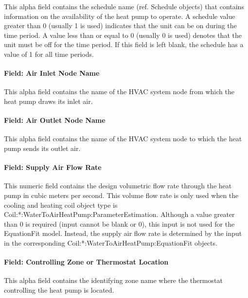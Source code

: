 This alpha field contains the schedule name (ref. Schedule objects) that contains information on the availability of the heat pump to operate. A schedule value greater than 0 (usually 1 is used) indicates that the unit can be on during the time period. A value less than or equal to 0 (usually 0 is used) denotes that the unit must be off for the time period. If this field is left blank, the schedule has a value of 1 for all time periods.

\paragraph{Field: Air Inlet Node Name}\label{field-air-inlet-node-name-2-002}

This alpha field contains the name of the HVAC system node from which the heat pump draws its inlet air.

\paragraph{Field: Air Outlet Node Name}\label{field-air-outlet-node-name-2-002}

This alpha field contains the name of the HVAC system node to which the heat pump sends its outlet air.

\paragraph{Field: Supply Air Flow Rate}\label{field-supply-air-flow-rate}

This numeric field contains the design volumetric flow rate through the heat pump in cubic meters per second. This volume flow rate is only used when the cooling and heating coil object type is Coil:*:WaterToAirHeatPump:ParameterEstimation. Although a value greater than 0 is required (input cannot be blank or 0), this input is not used for the EquationFit model. Instead, the supply air flow rate is determined by the input in the corresponding Coil:*:WaterToAirHeatPump:EquationFit objects.

\paragraph{Field: Controlling Zone or Thermostat Location}\label{field-controlling-zone-or-thermostat-location-7}

This alpha field contains the identifying zone name where the thermostat controlling the heat pump is located.


